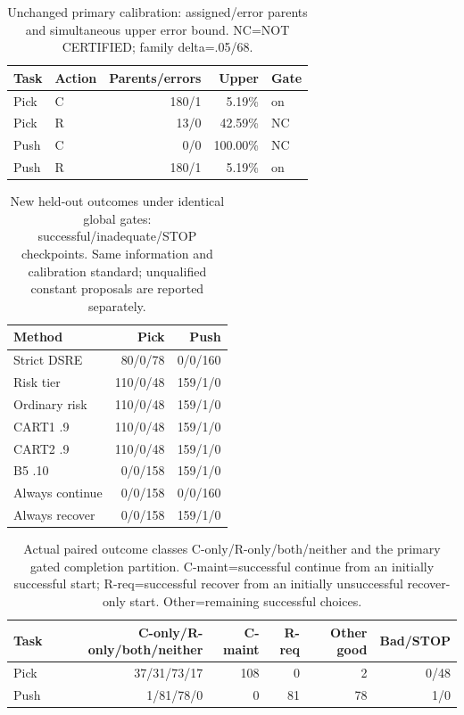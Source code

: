 \documentclass[conference]{IEEEtran}
\begin{document}
\begin{table}[t]
\caption{Unchanged primary calibration: assigned/error parents and simultaneous upper error bound. NC=NOT CERTIFIED; family delta=.05/68.}
\label{tab:calibration}\centering
\begin{tabular}{llrrl}\toprule
Task & Action & Parents/errors & Upper & Gate\\\midrule
Pick & C & 180/1 & 5.19\% & on\\
Pick & R & 13/0 & 42.59\% & NC\\
Push & C & 0/0 & 100.00\% & NC\\
Push & R & 180/1 & 5.19\% & on\\
\bottomrule\end{tabular}\end{table}

\begin{table}[t]
\caption{New held-out outcomes under identical global gates: successful/inadequate/STOP checkpoints. Same information and calibration standard; unqualified constant proposals are reported separately.}
\label{tab:final_operational}\centering
\begin{tabular}{lrr}\toprule
Method & Pick & Push\\\midrule
Strict DSRE & 80/0/78 & 0/0/160\\
Risk tier & 110/0/48 & 159/1/0\\
Ordinary risk & 110/0/48 & 159/1/0\\
CART1 .9 & 110/0/48 & 159/1/0\\
CART2 .9 & 110/0/48 & 159/1/0\\
B5 .10 & 0/0/158 & 159/1/0\\
Always continue & 0/0/158 & 0/0/160\\
Always recover & 0/0/158 & 159/1/0\\
\bottomrule\end{tabular}\end{table}

\begin{table}[t]
\caption{Actual paired outcome classes C-only/R-only/both/neither and the primary gated completion partition. C-maint=successful continue from an initially successful start; R-req=successful recover from an initially unsuccessful recover-only start. Other=remaining successful choices.}
\label{tab:primarydecomp}\centering
\begin{tabular}{lrrrrr}\toprule
Task & C-only/R-only/both/neither & C-maint & R-req & Other good & Bad/STOP\\\midrule
Pick & 37/31/73/17 & 108 & 0 & 2 & 0/48\\
Push & 1/81/78/0 & 0 & 81 & 78 & 1/0\\
\bottomrule\end{tabular}\end{table}
\end{document}
